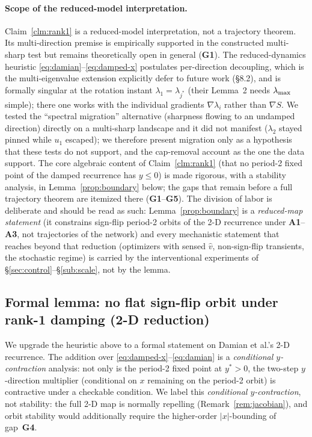 \paragraph{Scope of the reduced-model interpretation.} Claim~\ref{clm:rank1} is a
reduced-model interpretation, not a trajectory theorem. Its multi-direction
premise is empirically supported in the constructed multi-sharp test but
remains theoretically open in general (\textbf{G1}). The reduced-dynamics heuristic
\eqref{eq:damian}--\eqref{eq:damped-x} postulates per-direction decoupling,
which is the multi-eigenvalue extension \citet{damian2023selfstab} explicitly
defer to future work (\S8.2), and is formally singular at the rotation instant
$\lambda_{1}=\lambda_{j^{*}}$ (their Lemma~2 needs $\lambda_{\max}$ simple); there one
works with the individual gradients $\nabla\lambda_{i}$ rather than $\nabla S$.
We tested the ``spectral migration'' alternative (sharpness flowing to an
undamped direction) directly on a multi-sharp landscape and it did not manifest
($\lambda_{2}$ stayed pinned while $u_{1}$ escaped); we therefore present
migration only as a hypothesis that these tests do not support, and the cap-removal
account as the one the data support. The core algebraic content of
Claim~\ref{clm:rank1} (that no period-2 fixed point of the damped recurrence
has $y\leq0$) is made rigorous, with a stability analysis, in
Lemma~\ref{prop:boundary} below; the gaps that remain before a
full trajectory theorem are itemized there (\textbf{G1}--\textbf{G5}). The
division of labor is deliberate and should be read as such:
 Lemma~\ref{prop:boundary} is a \emph{reduced-map
statement} (it constrains sign-flip period-2 orbits of the 2-D recurrence under
\textbf{A1}--\textbf{A3}, not trajectories of the network) and every
mechanistic statement that reaches beyond that reduction (optimizers with sensed
$\hat v$, non-sign-flip transients, the stochastic regime) is carried by the
interventional experiments of \S\ref{sec:control}--\S\ref{sub:scale}, not by the
lemma.

\subsection{Formal lemma: no flat sign-flip orbit under rank-1 damping
(2-D reduction)}
\label{app:mig-formal}

We upgrade the heuristic above to a formal statement on Damian et al.'s 2-D
recurrence. The addition over \eqref{eq:damped-x}--\eqref{eq:damian} is a
\emph{conditional $y$-contraction} analysis: not only is the period-2 fixed
point at $y^{*}>0$, the two-step $y$-direction multiplier (conditional on $x$
remaining on the period-2 orbit) is contractive under a checkable condition. We
label this \emph{conditional $y$-contraction}, not stability: the full 2-D map
is normally repelling (Remark~\ref{rem:jacobian}), and orbit stability would
additionally require the higher-order $|x|$-bounding of gap~\textbf{G4}.

